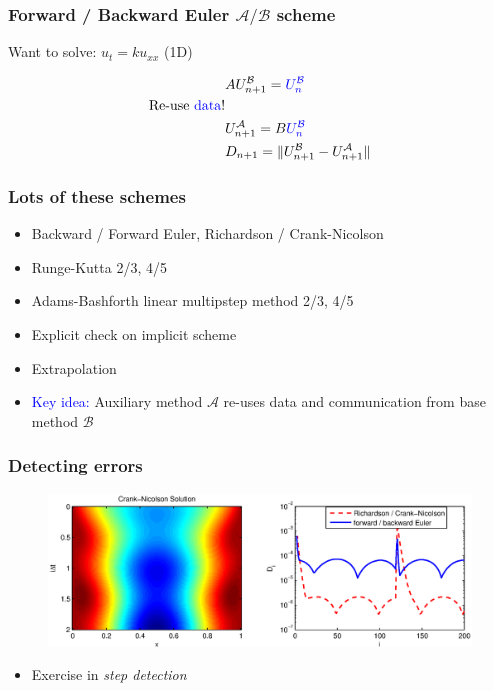 \documentclass{beamer}
\newcommand{\A}{\mathcal{A}}
\newcommand{\B}{\mathcal{B}}
\begin{document}
\begin{frame}
\frametitle{Forward / Backward Euler $\A/\B$ scheme}
Want to solve: $u_t = ku_{xx}$ (1D)

\begin{align}
& AU^{\B}_{n+1} = \textcolor{blue}{U^{\B}_{n}} \nonumber \\
\text{Re-use \textcolor{blue}{data}!} \nonumber \\
& U^{\A}_{n+1} = B\textcolor{blue}{U^{\B}_{n}} \nonumber \\
& D_{n+1} = \| U^{\B}_{n+1} - U^{\A}_{n+1} \| \nonumber
\end{align}



\end{frame}



%
\begin{frame}
\frametitle{Lots of these schemes}

\begin{itemize}
\item Backward / Forward Euler, Richardson / Crank-Nicolson
\item Runge-Kutta 2/3, 4/5
\item Adams-Bashforth linear multipstep method 2/3, 4/5
\item Explicit check on implicit scheme
\item Extrapolation
\end{itemize}

\pause
\begin{itemize}
\item \textcolor{blue}{Key idea:}  Auxiliary method $\A$ re-uses data and communication from base method $\B$
\end{itemize}

\end{frame}

%
\begin{frame}
\frametitle{Detecting errors}

\begin{figure}
  \centering
  \includegraphics[scale=0.5]{figs/heat_soln_diffs1.eps}
\end{figure}

\begin{itemize}
\item Exercise in \emph{step detection}
\end{itemize}

\end{frame}
\end{document}
